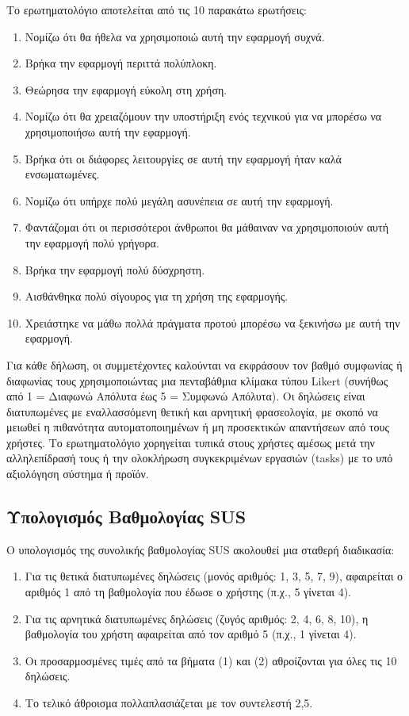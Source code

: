 \documentclass[
	12pt, %
	oneside, %
	greek,
	onehalfspacing, %
	liststotoc, %
	toctotoc, %
	parskip, %
	headsepline, %
]{MastersDoctoralThesis} %
\begin{document}
Το ερωτηματολόγιο αποτελείται από τις 10 παρακάτω ερωτήσεις:

\begin{enumerate}
    \item Νομίζω ότι θα ήθελα να χρησιμοποιώ αυτή την εφαρμογή συχνά.
    \item Βρήκα την εφαρμογή περιττά πολύπλοκη.
    \item Θεώρησα την εφαρμογή εύκολη στη χρήση.
    \item Νομίζω ότι θα χρειαζόμουν την υποστήριξη ενός τεχνικού για να μπορέσω να χρησιμοποιήσω αυτή την εφαρμογή.
    \item Βρήκα ότι οι διάφορες λειτουργίες σε αυτή την εφαρμογή ήταν καλά ενσωματωμένες.
    \item Νομίζω ότι υπήρχε πολύ μεγάλη ασυνέπεια σε αυτή την εφαρμογή.
    \item Φαντάζομαι ότι οι περισσότεροι άνθρωποι θα μάθαιναν να χρησιμοποιούν αυτή την εφαρμογή πολύ γρήγορα.
    \item Βρήκα την εφαρμογή πολύ δύσχρηστη.
    \item Αισθάνθηκα πολύ σίγουρος για τη χρήση της εφαρμογής.
    \item Χρειάστηκε να μάθω πολλά πράγματα προτού μπορέσω να ξεκινήσω με αυτή την εφαρμογή.
\end{enumerate}

Για κάθε δήλωση, οι συμμετέχοντες καλούνται να εκφράσουν τον βαθμό συμφωνίας ή διαφωνίας τους χρησιμοποιώντας μια πενταβάθμια κλίμακα τύπου Likert (συνήθως από 1 = Διαφωνώ Απόλυτα έως 5 = Συμφωνώ Απόλυτα). Οι δηλώσεις είναι διατυπωμένες με εναλλασσόμενη θετική και αρνητική φρασεολογία, με σκοπό να μειωθεί η πιθανότητα αυτοματοποιημένων ή μη προσεκτικών απαντήσεων από τους χρήστες. Το ερωτηματολόγιο χορηγείται τυπικά στους χρήστες αμέσως μετά την αλληλεπίδρασή τους ή την ολοκλήρωση συγκεκριμένων εργασιών (tasks) με το υπό αξιολόγηση σύστημα ή προϊόν.

\subsection{Υπολογισμός Βαθμολογίας SUS}

Ο υπολογισμός της συνολικής βαθμολογίας SUS ακολουθεί μια σταθερή διαδικασία:

\begin{enumerate}
    \item Για τις θετικά διατυπωμένες δηλώσεις (μονός αριθμός: 1, 3, 5, 7, 9), αφαιρείται ο αριθμός 1 από τη βαθμολογία που έδωσε ο χρήστης (π.χ., 5 γίνεται 4).
    \item Για τις αρνητικά διατυπωμένες δηλώσεις (ζυγός αριθμός: 2, 4, 6, 8, 10), η βαθμολογία του χρήστη αφαιρείται από τον αριθμό 5 (π.χ., 1 γίνεται 4).
    \item Οι προσαρμοσμένες τιμές από τα βήματα (1) και (2) αθροίζονται για όλες τις 10 δηλώσεις.
    \item Το τελικό άθροισμα πολλαπλασιάζεται με τον συντελεστή 2,5.
\end{enumerate}
\end{document}
